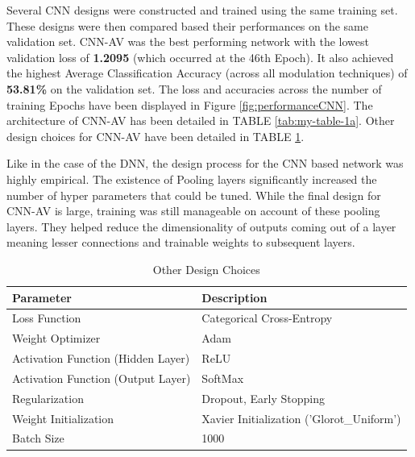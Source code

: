 \documentclass[journal,onecolumn]{IEEEtran}
\begin{document}
Several CNN designs were constructed and trained using the same training set. These designs were then compared based their performances on the same validation set. CNN-AV was the best performing network with the lowest validation loss of \textbf{1.2095} (which occurred at the 46th Epoch). It also achieved the highest Average Classification Accuracy (across all modulation techniques) of \textbf{53.81\%} on the validation set. The loss and accuracies across the number of training Epochs have been displayed in Figure \ref{fig:performanceCNN}. The architecture of CNN-AV has been detailed in TABLE \ref{tab:my-table-1a}. Other design choices for CNN-AV have been detailed in TABLE \ref{tab:my-table-1b}.

Like in the case of the DNN, the design process for the CNN based network was highly empirical. The existence of Pooling layers significantly increased the number of hyper parameters that could be tuned. While the final design for CNN-AV is large, training was still manageable on account of these pooling layers. They helped reduce the dimensionality of outputs coming out of a layer meaning lesser connections and trainable weights to subsequent layers. 

\begin{table}[]
\centering
\caption{Other Design Choices}
\label{tab:my-table-1b}
\begin{tabular}{@{}ll@{}}
\toprule
Parameter                          & Description                               \\ \midrule
Loss Function                      & Categorical Cross-Entropy                 \\
Weight Optimizer                   & Adam                                      \\
Activation Function (Hidden Layer) & ReLU                                      \\
Activation Function (Output Layer) & SoftMax                                   \\
Regularization                     & Dropout, Early Stopping                   \\
Weight Initialization              & Xavier Initialization ('Glorot\_Uniform') \\
Batch Size                         & 1000                                      \\ \bottomrule
\end{tabular}
\end{table}
\end{document}
